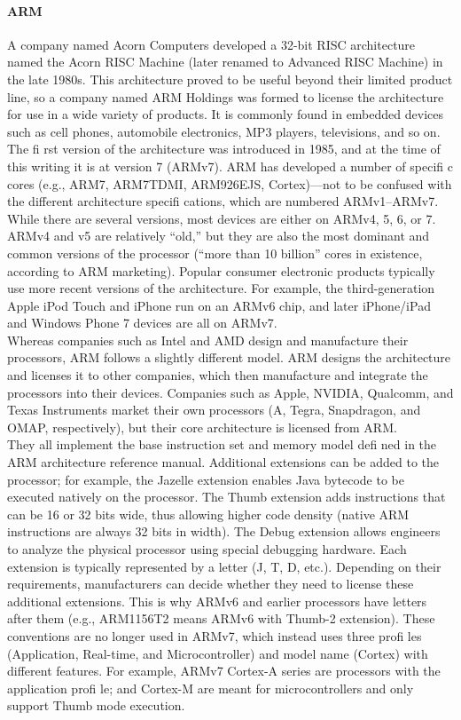 \paragraph*{ARM}
\hfill \break
A company named Acorn Computers developed a 32-bit RISC architecture named
the Acorn RISC Machine (later renamed to Advanced RISC Machine) in the late
1980s. This architecture proved to be useful beyond their limited product line,
so a company named ARM Holdings was formed to license the architecture for
use in a wide variety of products. It is commonly found in embedded devices
such as cell phones, automobile electronics, MP3 players, televisions, and so on.
The fi rst version of the architecture was introduced in 1985, and at the time of
this writing it is at version 7 (ARMv7). ARM has developed a number of specifi c
cores (e.g., ARM7, ARM7TDMI, ARM926EJS, Cortex)—not to be confused with
the different architecture specifi cations, which are numbered ARMv1–ARMv7.
While there are several versions, most devices are either on ARMv4, 5, 6, or 7.
ARMv4 and v5 are relatively “old,” but they are also the most dominant and
common versions of the processor (“more than 10 billion” cores in existence,
according to ARM marketing). Popular consumer electronic products typically
use more recent versions of the architecture. For example, the third-generation
Apple iPod Touch and iPhone run on an ARMv6 chip, and later iPhone/iPad
and Windows Phone 7 devices are all on ARMv7.\\
\-\hspace{1cm}Whereas companies such as Intel and AMD design and manufacture their
processors, ARM follows a slightly different model. ARM designs the architecture
and licenses it to other companies, which then manufacture and integrate the
processors into their devices. Companies such as Apple, NVIDIA, Qualcomm,
and Texas Instruments market their own processors (A, Tegra, Snapdragon, and OMAP, respectively), but their core architecture is licensed from ARM.\\
\-\hspace{1cm}They all implement the base instruction set and memory model defi ned in the
ARM architecture reference manual. Additional extensions can be added to
the processor; for example, the Jazelle extension enables Java bytecode to be
executed natively on the processor. The Thumb extension adds instructions
that can be 16 or 32 bits wide, thus allowing higher code density (native ARM
instructions are always 32 bits in width). The Debug extension allows engineers
to analyze the physical processor using special debugging hardware. Each
extension is typically represented by a letter (J, T, D, etc.). Depending on their
requirements, manufacturers can decide whether they need to license these
additional extensions. This is why ARMv6 and earlier processors have letters
after them (e.g., ARM1156T2 means ARMv6 with Thumb-2 extension). These
conventions are no longer used in ARMv7, which instead uses three profi les
(Application, Real-time, and Microcontroller) and model name (Cortex) with
different features. For example, ARMv7 Cortex-A series are processors with
the application profi le; and Cortex-M are meant for microcontrollers and only
support Thumb mode execution.

